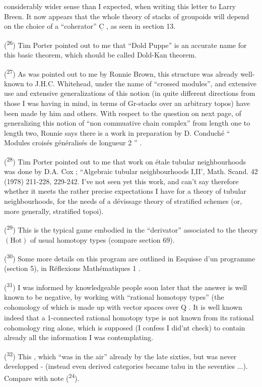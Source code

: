 
considerably wider sense than I expected, when writing this letter to Larry Breen. It now appears that the whole theory of stacks of groupoids will depend on the choice of a ``coherator'' $\underline{\mathrm{C}}$ , as seen in section 13.

(\textsuperscript{26}) Tim Porter pointed out to me that ``Dold Puppe'' is an accurate name for this basic theorem, which should be called Dold-Kan theorem.

(\textsuperscript{27}) As was pointed out to me by Ronnie Brown, this structure was already well-known to J.H.C. Whitehead, under the name of ``crossed modules'', and extensive use and extensive generalizations of this notion (in quite different directions from those I was having in mind, in terms of Gr-stacks over an arbitrary topos) have been made by him and others. With respect to the question on next page, of generalizing this notion of ``non commuative chain complex'' from length one to length two, Ronnie says there is a work in preparation by D. Conduché `` Modules croisés généralisés de longueur 2 '' .

(\textsuperscript{28}) Tim Porter pointed out to me that work on étale tubular neighbourhoods was done by D.A. Cox ; ``Algebraic tubular neighbourhoods I,II', Math. Scand. 42 (1978) 211-228, 229-242. I've not seen yet this work, and can't say therefore whether it meets the rather precise expectations I have for a theory of tubular neighbourhoods, for the needs of a dévissage theory of stratified schemes (or, more generally, stratified topoi).

(\textsuperscript{29}) This is the typical game  embodied in the ``derivator'' associated to the theory $(\mathrm{Hot})$ of usual homotopy types (compare section 69).

(\textsuperscript{30}) Some more details on this program are outlined in Esquisse d'un programme (section 5), in Réflexions Mathématiques 1 .

(\textsuperscript{31}) I was informed by knowledgeable people soon later that the answer is well known to be negative, by working with ``rational homotopy types'' (the cohomology of which is made up with vector spaces over $\underline{\mathrm{Q}}$ . It is well known indeed that a 1-connected rational homotopy type is not known from its rational cohomology ring alone, which is supposed (I confess I did'nt check) to contain already all the information I was contemplating.

(\textsuperscript{32}) This  , which ``was in the air'' already by the late sixties, but was never developped - (instead even derived categories became tabu in the seventies ...). Compare with note (\textsuperscript{24}).

